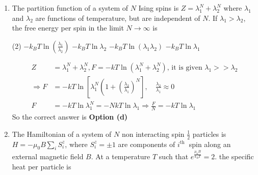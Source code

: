 \begin{enumerate}
\begin{answer}
\begin{align*}
\begin{array}{ccc}
	1 & -1 & 1 \\
	-1 & 1 & 1
	\end{array}\right\}-J\\
	&\begin{array}{lll}
	-1 & -1 & 1
	\end{array}\\
	&\left.\begin{array}{ccc}
	-1 & 1 & -1 \\
	1 & -1 & -1
	\end{array}\right\}-J\\
	&\left.\begin{array}{lll}
	-1 & -1 & -1
	\end{array}\right\} 3 J\\
	\Rightarrow&z=2 e^{-3 \beta J}+6 e^{\beta J}
	\end{align*}
	So the correct answer is \textbf{Option (b)}
\end{answer}
\item The partition function of a system of $N$ Ising spins is $Z=\lambda_{1}^{N}+\lambda_{2}^{N}$ where $\lambda_{1}$ and $\lambda_{2}$ are functions of temperature, but are independent of $N$. If $\lambda_{1}>\lambda_{2}$, the free energy per spin in the limit $N \rightarrow \infty$ is
 \begin{tasks}(2)
	\task[\textbf{a.}]$-k_{B} T \ln \left(\frac{\lambda_{1}}{\lambda_{2}}\right)$
	\task[\textbf{b.}] $-k_{B} T \ln \lambda_{2}$
	\task[\textbf{c.}]$-k_{B} T \ln \left(\lambda_{1} \lambda_{2}\right)$
	\task[\textbf{d.}] $-k_{B} T \ln \lambda_{1}$
\end{tasks}
\begin{answer}
	\begin{align*}
Z&=\lambda_{1}^{N}+\lambda_{2}^{N}, F=-k T \ln \left(\lambda_{1}^{N}+\lambda_{2}^{N}\right)\text{, it is given } \lambda_{1}>>\lambda_{2}\\
	\Rightarrow F&=-k T \ln \left[\lambda_{1}^{N}\left(1+\left(\frac{\lambda_{2}}{\lambda_{1}}\right)^{N}\right], \quad \frac{\lambda_{2}}{\lambda_{1}} \approx 0\right. \\
	F&=-k T \ln \lambda_{1}^{N}=-N k T \ln \lambda_{1} \Rightarrow \frac{F}{N}=-k T \ln \lambda_{1}
	\end{align*}
	So the correct answer is \textbf{Option (d)}
\end{answer}
\item The Hamiltonian of a system of $N$ non interacting spin $\frac{1}{2}$ particles is $H=-\mu_{0} B \sum_{i} S_{i}^{z}$, where $S_{i}^{z}=\pm 1$ are components of $i^{\text {th }}$ spin along an external magnetic field $B$. At a temperature $T$ such that $e^{\frac{\mu_{0} B}{k_{B} T}}=2$. the specific heat per particle is

\end{enumerate}
